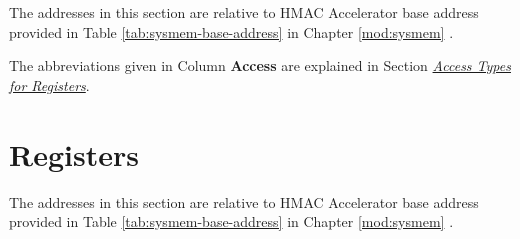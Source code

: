 \documentclass[main\_\_EN.tex]{subfiles}
\begin{document}
The addresses in this section are relative to HMAC Accelerator base address provided in Table \ref{tab:sysmem-base-address} in Chapter \ref{mod:sysmem} \textit{}.

The abbreviations given in Column \textbf{Access} are explained in Section \hyperref[glossary-access-types]{\textit{Access Types for Registers}}.






\clearpage
\section{Registers}

The addresses in this section are relative to HMAC Accelerator base address provided in Table \ref{tab:sysmem-base-address} in Chapter \ref{mod:sysmem} \textit{}.


\end{document}
